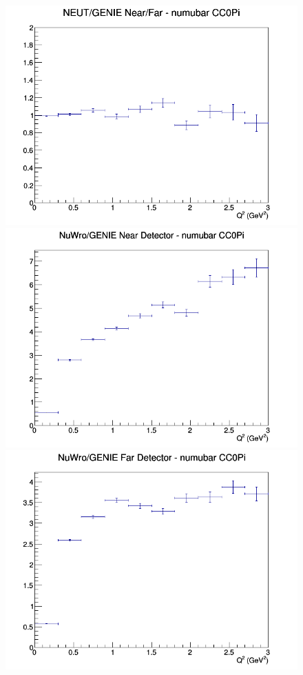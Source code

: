 \begin{figure}[h]
\endminipage
{}
\includegraphics[width=\linewidth]{eff_Q2/LAr/ratios/CC0Pi_NEUT_GENIE_numubar_NF_Q2.png}
\endminipage
\newline
{}
\includegraphics[width=\linewidth]{eff_Q2/LAr/ratios/CC0Pi_NuWro_GENIE_numubar_near_Q2.png}
\endminipage
{}
\includegraphics[width=\linewidth]{eff_Q2/LAr/ratios/CC0Pi_NuWro_GENIE_numubar_far_Q2.png}

\end{figure}
